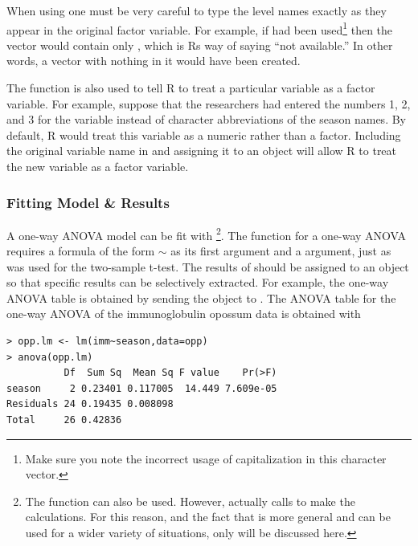 \documentclass[10pt,openany]{book}\usepackage[]{graphicx}\usepackage[]{color}
\makeatletter
\newenvironment{kframe}{%
 \def\at@end@of@kframe{}%
 \ifinner\ifhmode%
  \def\at@end@of@kframe{\end{minipage}}%
  \begin{minipage}{\columnwidth}%
 \fi\fi%
 \def\FrameCommand##1{\hskip\@totalleftmargin \hskip-\fboxsep
 \colorbox{shadecolor}{##1}\hskip-\fboxsep
     \hskip-\linewidth \hskip-\@totalleftmargin \hskip\columnwidth}%
 \MakeFramed {\advance\hsize-\width
   \@totalleftmargin\z@ \linewidth\hsize
   \@setminipage}}%
 {\par\unskip\endMakeFramed%
 \at@end@of@kframe}
\newenvironment{knitrout}{}{} %
\makeatother
\begin{document}
When using  one must be very careful to type the level names exactly as they appear in the original factor variable.  For example, if  had been used\footnote{Make sure you note the incorrect usage of capitalization in this character vector.} then the  vector would contain only , which is Rs way of saying ``not available.''  In other words, a vector with nothing in it would have been created.


The  function is also used to tell R to treat a particular variable as a factor variable.  For example, suppose that the researchers had entered the numbers 1, 2, and 3 for the  variable instead of character abbreviations of the season names.  By default, R would treat this variable as a numeric rather than a factor.  Including the original variable name in  and assigning it to an object will allow R to treat the new variable as a factor variable.


\subsubsection*{Fitting Model \& Results}
A one-way ANOVA model can be fit with \footnote{The  function can also be used.  However,  actually calls  to make the calculations.  For this reason, and the fact that  is more general and can be used for a wider variety of situations, only  will be discussed here.}.  The  function for a one-way ANOVA requires a formula of the form $\sim$ as its first argument and a  argument, just as was used for the two-sample t-test.  The results of  should be assigned to an object so that specific results can be selectively extracted.  For example, the one-way ANOVA table is obtained by sending the  object to .  The ANOVA table for the one-way ANOVA of the immunoglobulin opossum data is obtained with

\begin{knitrout}
\color{fgcolor}\begin{kframe}
\begin{verbatim}
> opp.lm <- lm(imm~season,data=opp)
> anova(opp.lm)
          Df  Sum Sq  Mean Sq F value    Pr(>F)
season     2 0.23401 0.117005  14.449 7.609e-05
Residuals 24 0.19435 0.008098                  
Total     26 0.42836                           
\end{verbatim}
\end{kframe}
\end{knitrout}
\end{document}

